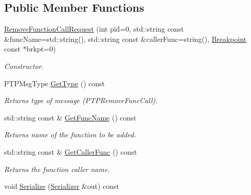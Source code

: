 \subsection*{Public Member Functions}
\begin{DoxyCompactItemize}
\item 
\hyperlink{class_common_1_1_remove_function_call_request_a91cadad0b3bce1f6d0c8212cd079825d}{Remove\-Function\-Call\-Request} (int pid=0, std\-::string const \&func\-Name=std\-::string(), std\-::string const \&caller\-Func=string(), \hyperlink{class_common_1_1_breakpoint}{Breakpoint} const $\ast$brkpt=0)
\begin{DoxyCompactList}\small\item\em Constructor. \end{DoxyCompactList}\item 
\hypertarget{class_common_1_1_remove_function_call_request_ad1ddf3ea5c23b28725463a9a8f33a619}{P\-T\-P\-Msg\-Type \hyperlink{class_common_1_1_remove_function_call_request_ad1ddf3ea5c23b28725463a9a8f33a619}{Get\-Type} () const }\label{class_common_1_1_remove_function_call_request_ad1ddf3ea5c23b28725463a9a8f33a619}

\begin{DoxyCompactList}\small\item\em Returns type of message (P\-T\-P\-Remove\-Func\-Call). \end{DoxyCompactList}\item 
\hypertarget{class_common_1_1_remove_function_call_request_a09ced083b7c54f9ab3278111ec04f2bc}{std\-::string const \& \hyperlink{class_common_1_1_remove_function_call_request_a09ced083b7c54f9ab3278111ec04f2bc}{Get\-Func\-Name} () const }\label{class_common_1_1_remove_function_call_request_a09ced083b7c54f9ab3278111ec04f2bc}

\begin{DoxyCompactList}\small\item\em Returns name of the function to be added. \end{DoxyCompactList}\item 
\hypertarget{class_common_1_1_remove_function_call_request_ade550fe8f74c1bb3dd701dae551d9b16}{std\-::string const \& \hyperlink{class_common_1_1_remove_function_call_request_ade550fe8f74c1bb3dd701dae551d9b16}{Get\-Caller\-Func} () const }\label{class_common_1_1_remove_function_call_request_ade550fe8f74c1bb3dd701dae551d9b16}

\begin{DoxyCompactList}\small\item\em Returns the function caller name. \end{DoxyCompactList}\item 
\hypertarget{class_common_1_1_remove_function_call_request_a7a7d5980c190cd8e2f830352d4eb2f9d}{void \hyperlink{class_common_1_1_remove_function_call_request_a7a7d5980c190cd8e2f830352d4eb2f9d}{Serialize} (\hyperlink{class_common_1_1_serializer}{Serializer} \&out) const }\label{class_common_1_1_remove_function_call_request_a7a7d5980c190cd8e2f830352d4eb2f9d}


\end{DoxyCompactItemize}
